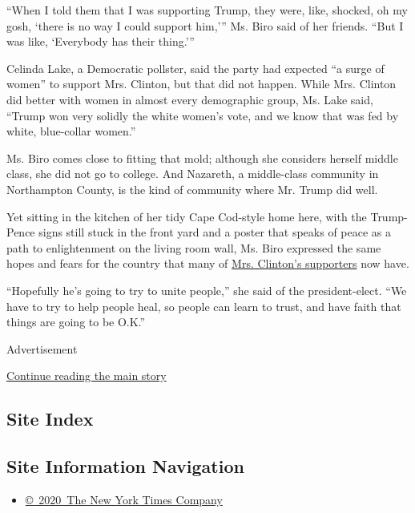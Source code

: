 ``When I told them that I was supporting Trump, they were, like,
shocked, oh my gosh, `there is no way I could support him,''' Ms. Biro
said of her friends. ``But I was like, `Everybody has their thing.'''

Celinda Lake, a Democratic pollster, said the party had expected ``a
surge of women'' to support Mrs. Clinton, but that did not happen. While
Mrs. Clinton did better with women in almost every demographic group,
Ms. Lake said, ``Trump won very solidly the white women's vote, and we
know that was fed by white, blue-collar women.''

Ms. Biro comes close to fitting that mold; although she considers
herself middle class, she did not go to college. And Nazareth, a
middle-class community in Northampton County, is the kind of community
where Mr. Trump did well.

Yet sitting in the kitchen of her tidy Cape Cod-style home here, with
the Trump-Pence signs still stuck in the front yard and a poster that
speaks of peace as a path to enlightenment on the living room wall, Ms.
Biro expressed the same hopes and fears for the country that many of
\href{http://www.nytimes.com/2016/11/11/us/politics/female-clinton-supporters-are-left-feeling-gutted.html}{Mrs.
Clinton's supporters} now have.

``Hopefully he's going to try to unite people,'' she said of the
president-elect. ``We have to try to help people heal, so people can
learn to trust, and have faith that things are going to be O.K.''

Advertisement

\protect\hyperlink{after-bottom}{Continue reading the main story}

\hypertarget{site-index}{%
\subsection{Site Index}\label{site-index}}

\hypertarget{site-information-navigation}{%
\subsection{Site Information
Navigation}\label{site-information-navigation}}

\begin{itemize}
\tightlist
\item
  \href{https://help.nytimes.com/hc/en-us/articles/115014792127-Copyright-notice}{©~2020~The
  New York Times Company}
\end{itemize}

